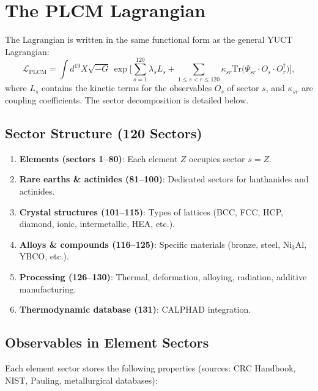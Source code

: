 \documentclass[12pt,a4paper]{article}
\begin{document}
	\section{The PLCM Lagrangian}
	
	The Lagrangian is written in the same functional form as the general YUCT Lagrangian:
	\[
	\mathcal{L}_{\text{PLCM}} = \int d^{19}X \sqrt{-G} \,
	\exp\Bigg[ \sum_{s=1}^{120} \lambda_s L_s + \sum_{1\le s<r\le 120} \kappa_{sr} \mathrm{Tr}\big(\Psi_{sr} \cdot O_s \cdot O_r^\dagger\big) \Bigg],
	\]
	where \(L_s\) contains the kinetic terms for the observables \(O_s\) of sector \(s\), and \(\kappa_{sr}\) are coupling coefficients. The sector decomposition is detailed below.
	
	\subsection{Sector Structure (120 Sectors)}
	
	\begin{enumerate}
		\item \textbf{Elements (sectors 1–80)}: Each element \(Z\) occupies sector \(s=Z\).
		\item \textbf{Rare earths \& actinides (81–100)}: Dedicated sectors for lanthanides and actinides.
		\item \textbf{Crystal structures (101–115)}: Types of lattices (BCC, FCC, HCP, diamond, ionic, intermetallic, HEA, etc.).
		\item \textbf{Alloys \& compounds (116–125)}: Specific materials (bronze, steel, Ni$_{3}$Al, YBCO, etc.).
		\item \textbf{Processing (126–130)}: Thermal, deformation, alloying, radiation, additive manufacturing.
		\item \textbf{Thermodynamic database (131)}: CALPHAD integration.
	\end{enumerate}
	
	\subsection{Observables in Element Sectors}
	
	Each element sector stores the following properties (sources: CRC Handbook, NIST, Pauling, metallurgical databases):
	
\end{document}
